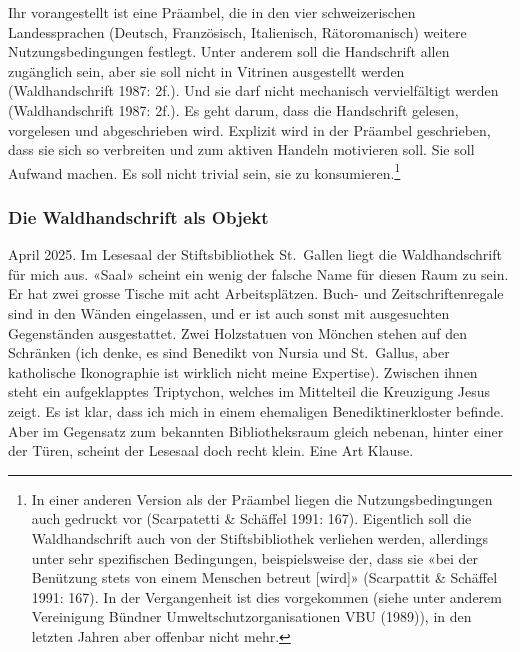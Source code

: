 \documentclass[a4paper,
fontsize=11pt,
oneside,
numbers=noperiodatend,
parskip=half-,
bibliography=totoc,
final
]{scrartcl}
\begin{document}
Ihr vorangestellt ist eine Präambel, die in den vier schweizerischen
Landessprachen (Deutsch, Französisch, Italienisch, Rätoromanisch)
weitere Nutzungsbedingungen festlegt. Unter anderem soll die Handschrift
allen zugänglich sein, aber sie soll nicht in Vitrinen ausgestellt
werden (Waldhandschrift 1987: 2f.). Und sie darf nicht mechanisch
vervielfältigt werden (Waldhandschrift 1987: 2f.). Es geht darum, dass
die Handschrift gelesen, vorgelesen und abgeschrieben wird. Explizit
wird in der Präambel geschrieben, dass sie sich so verbreiten und zum
aktiven Handeln motivieren soll. Sie soll Aufwand machen. Es soll nicht
trivial sein, sie zu konsumieren.\footnote{In einer anderen Version als
  der Präambel liegen die Nutzungsbedingungen auch gedruckt vor
  (Scarpatetti \& Schäffel 1991: 167). Eigentlich soll die
  Waldhandschrift auch von der Stiftsbibliothek verliehen werden,
  allerdings unter sehr spezifischen Bedingungen, beispielsweise der,
  dass sie «bei der Benützung stets von einem Menschen betreut
  {[}wird{]}» (Scarpattit \& Schäffel 1991: 167). In der Vergangenheit
  ist dies vorgekommen (siehe unter anderem Vereinigung Bündner
  Umweltschutzorganisationen VBU (1989)), in den letzten Jahren aber
  offenbar nicht mehr.}

\subsubsection{Die Waldhandschrift als
Objekt}\label{die-waldhandschrift-als-objekt}

April 2025. Im Lesesaal der Stiftsbibliothek St.~Gallen liegt die
Waldhandschrift für mich aus. «Saal» scheint ein wenig der falsche Name
für diesen Raum zu sein. Er hat zwei grosse Tische mit acht
Arbeitsplätzen. Buch- und Zeitschriftenregale sind in den Wänden
eingelassen, und er ist auch sonst mit ausgesuchten Gegenständen
ausgestattet. Zwei Holzstatuen von Mönchen stehen auf den Schränken (ich
denke, es sind Benedikt von Nursia und St.~Gallus, aber katholische
Ikonographie ist wirklich nicht meine Expertise). Zwischen ihnen steht
ein aufgeklapptes Triptychon, welches im Mittelteil die Kreuzigung Jesus
zeigt. Es ist klar, dass ich mich in einem ehemaligen
Benediktinerkloster befinde. Aber im Gegensatz zum bekannten
Bibliotheksraum gleich nebenan, hinter einer der Türen, scheint der
Lesesaal doch recht klein. Eine Art Klause.
\end{document}
